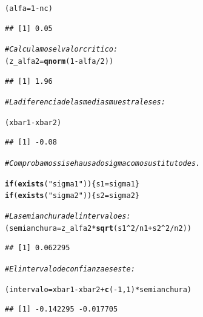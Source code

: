 \documentclass[10pt,a4paper]{article}\usepackage[]{graphicx}\usepackage[]{color}
\makeatletter
\newcommand{\hlnum}[1]{\textcolor[rgb]{0.686,0.059,0.569}{#1}}%
\newcommand{\hlstr}[1]{\textcolor[rgb]{0.192,0.494,0.8}{#1}}%
\newcommand{\hlcom}[1]{\textcolor[rgb]{0.678,0.584,0.686}{\textit{#1}}}%
\newcommand{\hlopt}[1]{\textcolor[rgb]{0,0,0}{#1}}%
\newcommand{\hlstd}[1]{\textcolor[rgb]{0.345,0.345,0.345}{#1}}%
\newcommand{\hlkwa}[1]{\textcolor[rgb]{0.161,0.373,0.58}{\textbf{#1}}}%
\newcommand{\hlkwb}[1]{\textcolor[rgb]{0.69,0.353,0.396}{#1}}%
\newcommand{\hlkwd}[1]{\textcolor[rgb]{0.737,0.353,0.396}{\textbf{#1}}}%
\newenvironment{kframe}{%
 \def\at@end@of@kframe{}%
 \ifinner\ifhmode%
  \def\at@end@of@kframe{\end{minipage}}%
  \begin{minipage}{\columnwidth}%
 \fi\fi%
 \def\FrameCommand##1{\hskip\@totalleftmargin \hskip-\fboxsep
 \colorbox{shadecolor}{##1}\hskip-\fboxsep
     \hskip-\linewidth \hskip-\@totalleftmargin \hskip\columnwidth}%
 \MakeFramed {\advance\hsize-\width
   \@totalleftmargin\z@ \linewidth\hsize
   \@setminipage}}%
 {\par\unskip\endMakeFramed%
 \at@end@of@kframe}
\newenvironment{knitrout}{}{} %
\makeatother
\begin{document}
{\begin{enumerate}
\begin{knitrout}
\begin{kframe}
\begin{alltt}
    \hlstd{(alfa} \hlkwb{=} \hlnum{1} \hlopt{-} \hlstd{nc)}
\end{alltt}
\begin{verbatim}
## [1] 0.05
\end{verbatim}
\begin{alltt}
    \hlcom{# Calculamos el valor critico:}
    \hlstd{(z_alfa2} \hlkwb{=} \hlkwd{qnorm}\hlstd{(} \hlnum{1} \hlopt{-} \hlstd{alfa} \hlopt{/} \hlnum{2}\hlstd{))}
\end{alltt}
\begin{verbatim}
## [1] 1.96
\end{verbatim}
\begin{alltt}
    \hlcom{# La diferencia de las medias muestrales es:}

    \hlstd{(xbar1} \hlopt{-} \hlstd{xbar2)}
\end{alltt}
\begin{verbatim}
## [1] -0.08
\end{verbatim}
\begin{alltt}
    \hlcom{# Comprobamos si se ha usado sigma como sustituto de s.}

    \hlkwa{if}\hlstd{(}\hlkwd{exists}\hlstd{(}\hlstr{"sigma1"}\hlstd{))\{s1} \hlkwb{=} \hlstd{sigma1\}}
    \hlkwa{if}\hlstd{(}\hlkwd{exists}\hlstd{(}\hlstr{"sigma2"}\hlstd{))\{s2} \hlkwb{=} \hlstd{sigma2\}}

    \hlcom{# La semianchura del intervalo es:}
    \hlstd{(semianchura} \hlkwb{=} \hlstd{z_alfa2} \hlopt{*} \hlkwd{sqrt}\hlstd{(s1}\hlopt{^}\hlnum{2}\hlopt{/}\hlstd{n1} \hlopt{+} \hlstd{s2}\hlopt{^}\hlnum{2}\hlopt{/}\hlstd{n2))}
\end{alltt}
\begin{verbatim}
## [1] 0.062295
\end{verbatim}
\begin{alltt}
    \hlcom{# El intervalo de confianza es este:}

    \hlstd{(intervalo} \hlkwb{=} \hlstd{xbar1} \hlopt{-} \hlstd{xbar2} \hlopt{+} \hlkwd{c}\hlstd{(}\hlopt{-}\hlnum{1}\hlstd{,} \hlnum{1}\hlstd{)} \hlopt{*} \hlstd{semianchura )}
\end{alltt}
\begin{verbatim}
## [1] -0.142295 -0.017705
\end{verbatim}
\end{kframe}
\end{knitrout}


\end{enumerate}}
\end{document}
